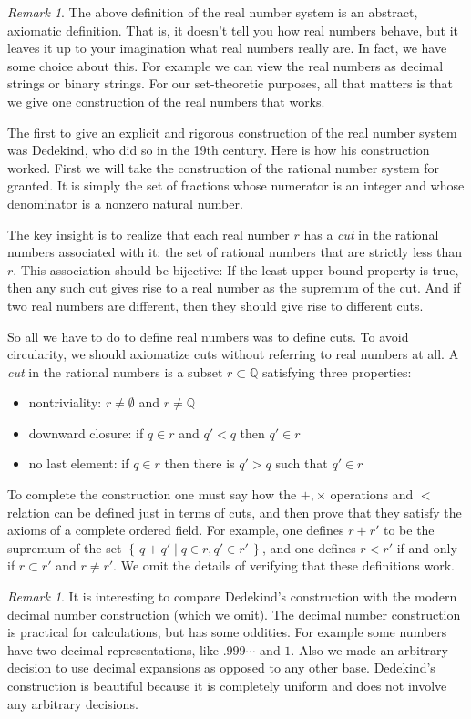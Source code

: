 \documentclass[11pt,oneside]{amsbook}
\newcommand{\set}[1]{\left\{\,#1\,\right\}}
\newcommand{\QQ}{\mathbb Q}
\theoremstyle{definition}
\theoremstyle{plain}
\theoremstyle{definition}
\theoremstyle{remark}
\newtheorem{rem}[thm]{Remark}
\begin{document}
\begin{rem}
  The above definition of the real number system is an abstract, axiomatic definition. That is, it doesn't tell you how real numbers behave, but it leaves it up to your imagination what real numbers really are. In fact, we have some choice about this. For example we can view the real numbers as decimal strings or binary strings. For our set-theoretic purposes, all that matters is that we give one construction of the real numbers that works.
\end{rem}

The first to give an explicit and rigorous construction of the real number system was Dedekind, who did so in the 19th century. Here is how his construction worked. First we will take the construction of the rational number system for granted. It is simply the set of fractions whose numerator is an integer and whose denominator is a nonzero natural number.

The key insight is to realize that each real number $r$ has a \emph{cut} in the rational numbers associated with it: the set of rational numbers that are strictly less than $r$. This association should be bijective: If the least upper bound property is true, then any such cut gives rise to a real number as the supremum of the cut. And if two real numbers are different, then they should give rise to different cuts.

So all we have to do to define real numbers was to define cuts. To avoid circularity, we should axiomatize cuts without referring to real numbers at all. A \emph{cut} in the rational numbers is a subset $r\subset\QQ$ satisfying three properties:
\begin{itemize}
\item nontriviality: $r\neq\emptyset$ and $r\neq\QQ$
\item downward closure: if $q\in r$ and $q'<q$ then $q'\in r$
\item no last element: if $q\in r$ then there is $q'>q$ such that $q'\in r$
\end{itemize}
To complete the construction one must say how the $+,\times$ operations and $<$ relation can be defined just in terms of cuts, and then prove that they satisfy the axioms of a complete ordered field. For example, one defines $r+r'$ to be the supremum of the set $\set{q+q'\mid q\in r,q'\in r'}$, and one defines $r<r'$ if and only if $r\subset r'$ and $r\neq r'$. We omit the details of verifying that these definitions work.

\begin{rem}
  It is interesting to compare Dedekind's construction with the modern decimal number construction (which we omit). The decimal number construction is practical for calculations, but has some oddities. For example some numbers have two decimal representations, like $.999\cdots$ and $1$. Also we made an arbitrary decision to use decimal expansions as opposed to any other base. Dedekind's construction is beautiful because it is completely uniform and does not involve any arbitrary decisions.
\end{rem}
\end{document}
